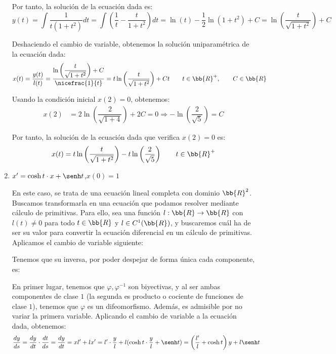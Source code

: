 \begin{ejercicio}
\begin{enumerate}
        Por tanto, la solución de la ecuación dada es:
        \begin{equation*}
            y(t) = \int \dfrac{1}{t(1+t^2)}dt = \int \left(\dfrac{1}{t} - \dfrac{t}{1+t^2}\right)dt = \ln(t) - \dfrac{1}{2}\ln(1+t^2) + C = \ln\left(\dfrac{t}{\sqrt{1+t^2}}\right) + C
        \end{equation*}

        Deshaciendo el cambio de variable, obtenemos la solución uniparamétrica de la ecuación dada:
        \begin{equation*}
            x(t) = \dfrac{y(t)}{l(t)} = \dfrac{\ln\left(\dfrac{t}{\sqrt{1+t^2}}\right) + C}{\nicefrac{1}{t}} = t\ln\left(\dfrac{t}{\sqrt{1+t^2}}\right) + Ct \qquad t\in \bb{R}^+, \qquad C\in \bb{R}
        \end{equation*}

        Usando la condición inicial $x(2)=0$, obtenemos:
        \begin{align*}
            x(2) &= 2\ln\left(\dfrac{2}{\sqrt{1+4}}\right) + 2C = 0 \Longrightarrow -\ln\left(\dfrac{2}{\sqrt{5}}\right) =C
        \end{align*}

        Por tanto, la solución de la ecuación dada que verifica $x(2)=0$ es:
        \begin{equation*}
            x(t) = t\ln\left(\dfrac{t}{\sqrt{1+t^2}}\right) - t\ln\left(\dfrac{2}{\sqrt{5}}\right) \qquad t\in \bb{R}^+
        \end{equation*}
        
        \item $x' = \cosh t \cdot x + \senh t$,\qquad $x(0) = 1$
        
        En este caso, se trata de una ecuación lineal completa con dominio $\bb{R}^2$.
        Buscamos transformarla en una ecuación que podamos resolver mediante cálculo de primitivas.
        Para ello, sea una función $l:\bb{R}\to \bb{R}$ con $l(t)\neq 0$ para todo $t\in \bb{R}$ y $l\in C^1(\bb{R})$, y buscaremos cuál ha de ser su valor para convertir la ecuación diferencial en un cálculo de primitivas.
        Aplicamos el cambio de variable siguiente:

        Tenemos que su inversa, por poder despejar de forma única cada componente, es:

        En primer lugar, tenemos que $\varphi,\varphi^{-1}$ son biyectivas, y al ser ambas componentes de clase $1$ (la segunda es producto o cociente de funciones de clase $1$), tenemos que $\varphi$ es un difeomorfismo. Además, es admisible por no variar la primera variable.
        Aplicando el cambio de variable a la ecuación dada, obtenemos:
        \begin{align*}
            \dfrac{dy}{ds} &= \dfrac{dy}{dt}\cdot \dfrac{dt}{ds} = \dfrac{dy}{dt} = xl' + lx' = l'\cdot \dfrac{y}{l} + l(\cosh t \cdot \dfrac{y}{l} + \senh t)
            = \left(\dfrac{l'}{l} +\cosh t\right)y + l\senh t
        \end{align*}


\end{enumerate}
\end{ejercicio}
